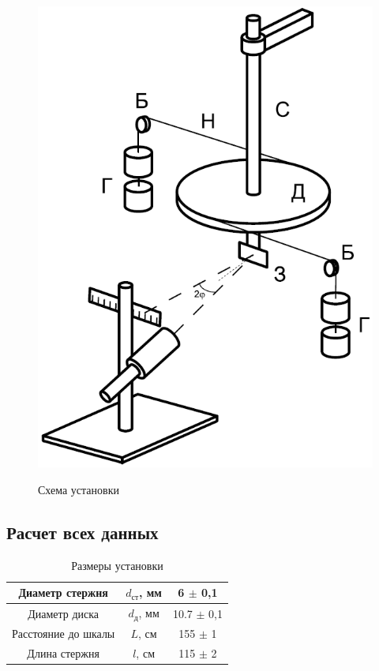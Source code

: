 \documentclass[a4paper]{article}
\begin{document}
\begin{figure}[!h]
    \begin{center}
        \includegraphics[scale=0.7]{ystanovka1.png}
        \begin{center}
        \caption{Схема установки}
        \end{center}
        \label{graphic1b}
    \end{center}
\end{figure}


\newpage
\subsection{Расчет всех данных}

\begin{table}[h!]
\begin{center}
\begin{tabular}{|c|c|c|}
\hline
Диаметр стержня     & $d_{\text{ст}}$, мм & 6 $\pm$ 0,1  \\ \hline
Диаметр диска       & $d_{\text{д}}$, мм  & 10.7 $\pm$ 0,1    \\ \hline
Расстояние до шкалы & $L$, см             & 155 $\pm$ 1     \\ \hline
Длина стержня       & $l$, см             & 115 $\pm$ 2 \\ \hline
\end{tabular}
\caption{Размеры установки}
\end{center}
\end{table}
\end{document}
